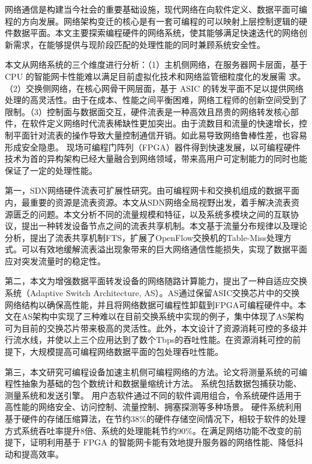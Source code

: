 
\label{chap6}

\label{chap61}

网络通信是构建当今社会的重要基础设施，现代网络在向软件定义、数据平面可编程的方向发展。网络架构变迁的核心是有一套可编程的可以映射上层控制逻辑的硬件数据平面。本文主要探索编程硬件的网络系统，使其能够满足快速迭代的网络创新需求，在能够提供与现阶段匹配的处理性能的同时兼顾系统安全性。

本文从网络系统的三个维度进行分析：（1）主机侧网络，在服务器网卡层面，基于 CPU 的智能网卡性能难以满足目前虚拟化技术和网络监管细粒度化的发展需
求。（2）交换侧网络，在核心网骨干网层面，基于 ASIC 的转发平面不足以提供网络处理的高灵活性。由于在成本、性能之间平衡困难，网络工程师的创新空间受到了限制。（3）控制面与数据面交互，硬件流表是一种高效且昂贵的网络转发核心部件，在软件定义网络时代流表稀缺性更加突出。由于流数目和流量的快速增长，控制平面针对流表的操作导致大量控制通信开销。如此易导致网络鲁棒性差，也容易形成安全隐患。
现场可编程门阵列（FPGA）器件得到快速发展，以可编程硬件技术为首的异构架构已经大量融合到网络领域，带来高用户可定制能力的同时也能保证了一定的处理性能。

第一，SDN网络硬件流表可扩展性研究。由可编程网卡和交换机组成的数据平面内，最重要的资源是流表资源。本文从SDN网络全局视野出发，着手解决流表资源匮乏的问题。本文分析不同的流量规模和特征，以及系统多模块之间的互联协议，提出一种转发设备节点之间的流表共享机制。本文基于流量分布规律以及理论分析，提出了流表共享机制FTS，扩展了OpenFlow交换机的Table-Miss处理方式。可以有效地缓解流表溢出现象带来的巨大网络通信性能损失，实现了数据平面应对突发流量时的稳定性。


第二，本文为增强数据平面转发设备的网络随路计算能力，提出了一种自适应交换系统（Adaptive Switch Architecture, AS）。AS通过保留ASIC交换芯片中的交换网络结构以确保高性能，并且将网络数据可编程性卸载到FPGA可编程硬件中。本文在AS架构中实现了三种难以在目前交换系统中实现的例子，集中体现了AS架构可为目前的交换芯片带来极高的灵活性。此外，本文设计了资源消耗可控的多级并行流水线，并使以上三个应用达到了数个Tbps的吞吐性能。在资源消耗可控的前提下，大规模提高可编程网络数据平面的包处理吞吐性能。

第三，本文研究可编程设备加速主机侧可编程网络的方法。论文将测量系统的可编程性抽象为基础的包个数统计和数据量缩统计方法。
系统包括数据包捕获功能、测量系统和发送引擎。
用户态软件通过不同的软件调用组合，令系统硬件适用于高性能的网络安全、访问控制、流量控制、拥塞探测等多种场景。
硬件系统利用基于硬件的存储压缩算法，在节约38\%的硬件存储空间情况下，相较于软件的处理方式系统吞吐率提升8倍、系统的处理能耗节约90\%。在满足网络功能不改变的前提下，证明利用基于 FPGA 的智能网卡能有效地提升服务器的网络性能、降低抖动和提高效率。



